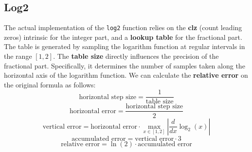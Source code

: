 \documentclass[11pt]{article}
\begin{document}
\subsection{Log2}
The actual implementation of the \texttt{log2} function relies on the \textbf{clz} (count leading zeros) intrinsic for the integer part, and a \textbf{lookup table} for the fractional part. The table is generated by sampling the logarithm function at regular intervals in the range $[1, 2]$.
The \textbf{table size} directly influences the precision of the fractional part. Specifically, it determines the number of samples taken along the horizontal axis of the logarithm function. We can calculate the \textbf{relative error} on the original formula as follows:
\setcounter{equation}{0}
\begin{equation}
    \text{horizontal step size} = \frac{1}{\text{table size}}
\end{equation}
\begin{equation}
    \text{horizontal error} = \frac{\text{horizontal step size}}{2}
\end{equation}
\begin{equation}
    \text{vertical error} = \text{horizontal error} \cdot \max_{x \in [1,2]} \left|\frac{d}{dx}\log_2(x)\right|
\end{equation}
\begin{equation}
    \text{accumulated error} = \text{vertical error} \cdot 3
\end{equation}
\begin{equation}
    \text{relative error} = \ln(2) \cdot \text{accumulated error}
\end{equation}
\end{document}
